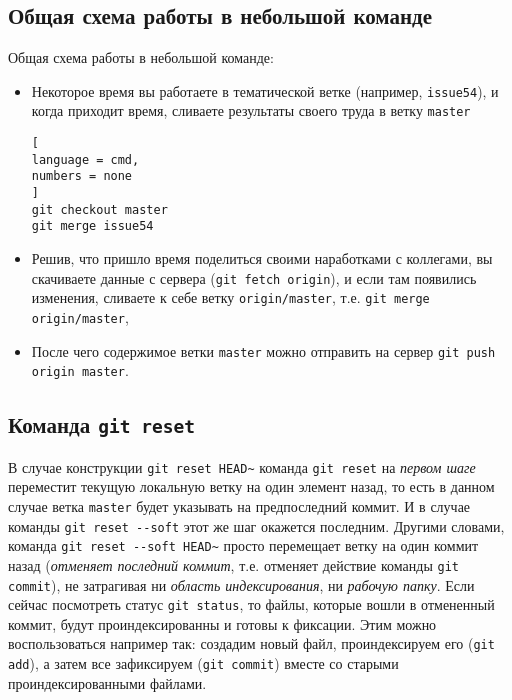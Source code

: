\documentclass[%
	11pt,
	a4paper,
	utf8,
		]{article}
\begin{document}
\subsection{Общая схема работы в небольшой команде}

Общая схема работы в небольшой команде:
\begin{itemize}
	\item Некоторое время вы работаете в тематической ветке (например, \texttt{issue54}), и когда приходит время, сливаете результаты своего труда в ветку \texttt{master}
	
\begin{lstlisting}[
language = cmd,
numbers = none
]
git checkout master
git merge issue54
\end{lstlisting}
	
	\item Решив, что пришло время поделиться своими наработками с коллегами, вы скачиваете данные с сервера (\texttt{git fetch origin}), и если там появились изменения, сливаете к себе ветку \texttt{origin/master}, т.е. \texttt{git merge origin/master},
	
	\item После чего содержимое ветки \texttt{master} можно отправить на сервер \texttt{git push origin master}.
\end{itemize}

\subsection{Команда \texttt{git reset}}

В случае конструкции \texttt{git reset HEAD\~} команда \texttt{git reset} на \emph{первом шаге} переместит текущую локальную ветку на один элемент назад, то есть в данном случае ветка \texttt{master} будет указывать на предпоследний коммит. И в случае команды \verb|git reset --soft| этот же шаг окажется последним. Другими словами, команда \verb|git reset --soft HEAD~| просто перемещает ветку на один коммит назад (\emph{отменяет последний коммит}, т.е. отменяет действие команды \texttt{git commit}), не затрагивая ни \emph{область индексирования}, ни \emph{рабочую папку}. Если сейчас посмотреть статус \texttt{git status}, то файлы, которые вошли в отмененный коммит, будут проиндексированны и готовы к фиксации. Этим можно воспользоваться например так: создадим новый файл, проиндексируем его (\texttt{git add}), а затем все зафиксируем (\texttt{git commit}) вместе со старыми проиндексированными файлами.
\end{document}
